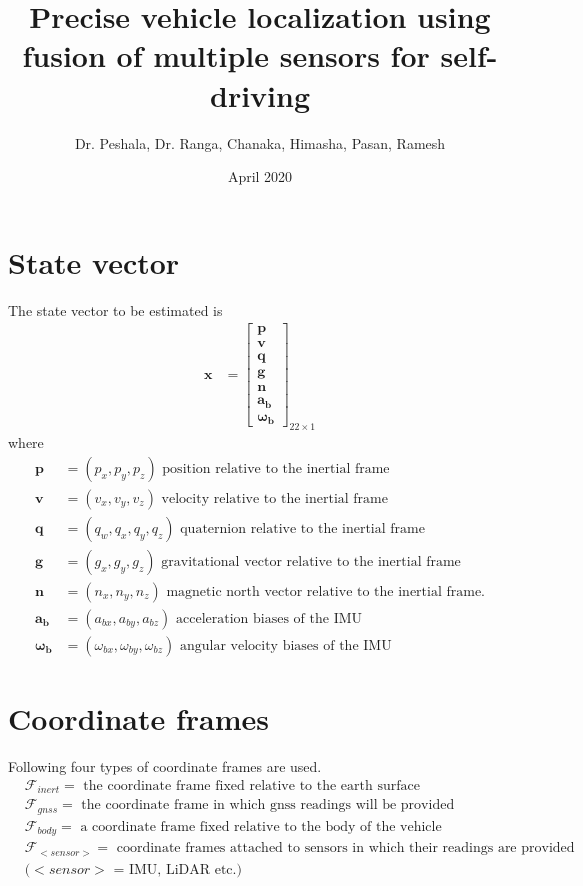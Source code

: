 \documentclass{article}
\title{Precise vehicle localization using fusion of multiple sensors for self-driving}
\date{April 2020}
\author{ Dr. Peshala, Dr. Ranga, Chanaka, Himasha, Pasan, Ramesh}
\begin{document}
\maketitle

\section{State vector}
The state vector to be estimated is
\begin{align}
    \textbf{x} &= \left[\begin{matrix}{}\textbf{p} \\ \textbf{v} \\ \textbf{q} \\ \textbf{g} \\ \textbf{n} \\ \boldsymbol{a_b} \\ \boldsymbol{\omega_b} \end{matrix} \right]_{22\times1}
\end{align}{}
where
\begin{align}
    \textbf{p} &= (p_x, p_y, p_z) \text{ position relative to the inertial frame} \nonumber \\
    \textbf{v} &= (v_x, v_y, v_z) \text{ velocity relative to the inertial frame} \nonumber \\
    \textbf{q} &= (q_w, q_x, q_y, q_z) \text{ quaternion relative to the inertial frame} \nonumber \\
    \textbf{g} &= (g_x, g_y, g_z) \text{ gravitational vector relative to the inertial frame} \nonumber \\
    \textbf{n} &= (n_x, n_y, n_z) \text{ magnetic north vector relative to the inertial frame.} \nonumber \\
    \boldsymbol{a_b} &= (a_{bx}, a_{by}, a_{bz}) \text{ acceleration biases of the IMU} \nonumber \\
    \boldsymbol{\omega_b} &= (\omega_{bx}, \omega_{by}, \omega_{bz}) \text{ angular velocity biases of the IMU}
\end{align}{}


\section{Coordinate frames}
Following four types of coordinate frames are used.
\begin{align}
    &\mathcal{F}_{inert}=\text{ the coordinate frame fixed relative to the earth surface} \nonumber \\
    &\mathcal{F}_{gnss}=\text{ the coordinate frame in which gnss readings will be provided} \nonumber \\
    &\mathcal{F}_{body}=\text{ a coordinate frame fixed relative to the body of the vehicle} \nonumber \\
    &\mathcal{F}_{<sensor>}=\text{ coordinate frames attached to sensors in which their readings are provided} \nonumber \\
    &\text{($<sensor>$ = IMU, LiDAR etc.)}
\end{align}{}
\end{document}
